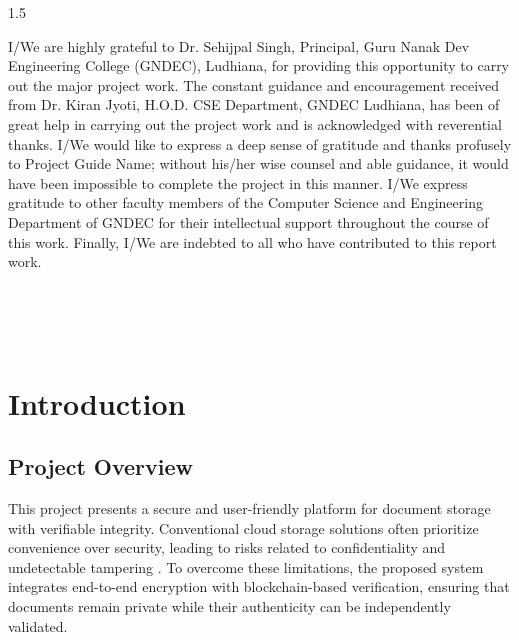 \documentclass[12pt]{article}
\begin{document}
\begin{spacing}{1.5}

\noindent I/We are highly grateful to Dr. Sehijpal Singh, Principal, Guru Nanak Dev Engineering College (GNDEC), Ludhiana, for providing this opportunity to carry out the major project work. The constant guidance and encouragement received from Dr. Kiran Jyoti, H.O.D. CSE Department, GNDEC Ludhiana, has been of great help in carrying out the project work and is acknowledged with reverential thanks. I/We would like to express a deep sense of gratitude and thanks profusely to Project Guide Name; without his/her wise counsel and able guidance, it would have been impossible to complete the project in this manner. I/We express gratitude to other faculty members of the Computer Science and Engineering Department of GNDEC for their intellectual support throughout the course of this work. Finally, I/We are indebted to all who have contributed to this report work.

\end{spacing}

\vspace{0.5cm}

\\

\\

\\

\newpage

\tableofcontents
\newpage
\listoffigures
\newpage


\newpage
\section{Introduction}

\subsection{Project Overview}

This project presents a secure and user-friendly platform for document storage with verifiable integrity. Conventional cloud storage solutions often prioritize convenience over security, leading to risks related to confidentiality and undetectable tampering \cite{stallings2017}. To overcome these limitations, the proposed system integrates end-to-end encryption with blockchain-based verification, ensuring that documents remain private while their authenticity can be independently validated.
\end{document}
